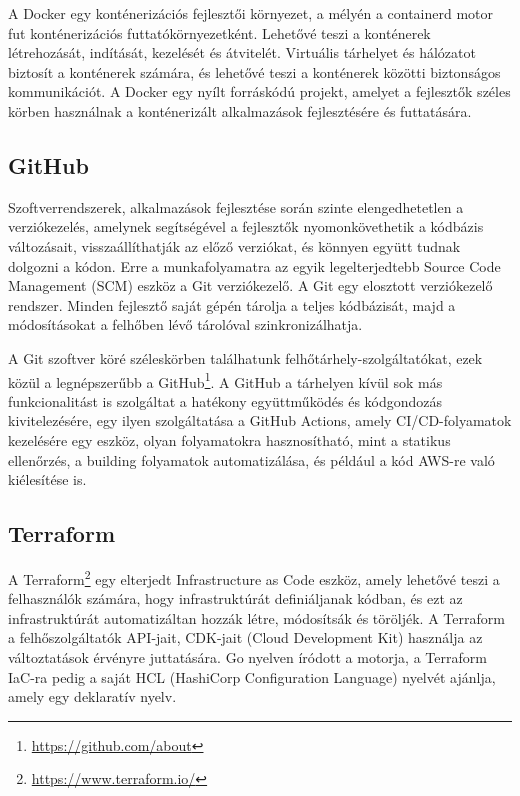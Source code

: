 A Docker egy konténerizációs fejlesztői környezet, a mélyén a containerd motor fut konténerizációs futtatókörnyezetként. \cite{Docker} Lehetővé teszi a konténerek létrehozását, indítását, kezelését és átvitelét. Virtuális tárhelyet és hálózatot biztosít a konténerek számára, és lehetővé teszi a konténerek közötti biztonságos kommunikációt. A Docker egy nyílt forráskódú projekt, amelyet a fejlesztők széles körben használnak a konténerizált alkalmazások fejlesztésére és futtatására.

\subsection{GitHub}

Szoftverrendszerek, alkalmazások fejlesztése során szinte elengedhetetlen a verziókezelés, amelynek segítségével a fejlesztők nyomonkövethetik a kódbázis változásait, visszaállíthatják az előző verziókat, és könnyen együtt tudnak dolgozni a kódon. Erre a munkafolyamatra az egyik legelterjedtebb Source Code Management (SCM) eszköz a Git verziókezelő. A Git egy elosztott verziókezelő rendszer. Minden fejlesztő saját gépén tárolja a teljes kódbázisát, majd a módosításokat a felhőben lévő tárolóval szinkronizálhatja.

A Git szoftver köré széleskörben találhatunk felhőtárhely-szolgáltatókat, ezek közül a legnépszerűbb a GitHub\footnote{\url{https://github.com/about}}. A GitHub a tárhelyen kívül sok más funkcionalitást is szolgáltat a hatékony együttműködés és kódgondozás kivitelezésére, egy ilyen szolgáltatása a GitHub Actions, amely CI/CD-folyamatok kezelésére egy eszköz, olyan folyamatokra hasznosítható, mint a statikus ellenőrzés, a building folyamatok automatizálása, és például a kód AWS-re való kiélesítése is.

\subsection{Terraform}

A Terraform\footnote{\url{https://www.terraform.io/}} egy elterjedt Infrastructure as Code eszköz, amely lehetővé teszi a felhasználók számára, hogy infrastruktúrát definiáljanak kódban, és ezt az infrastruktúrát automatizáltan hozzák létre, módosítsák és töröljék. A Terraform a felhőszolgáltatók API-jait, CDK-jait (Cloud Development Kit) használja az változtatások érvényre juttatására. Go nyelven íródott a motorja, a Terraform IaC-ra pedig a saját HCL (HashiCorp Configuration Language) nyelvét ajánlja, amely egy deklaratív nyelv.
